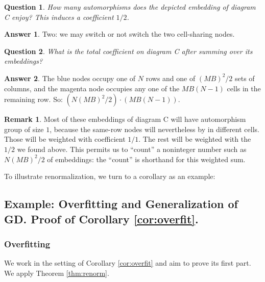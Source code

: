 \documentclass{article}
\theoremstyle{plain}
\newtheorem*{quest*}{Question}
\theoremstyle{definition}
\newtheorem*{answ*}{Answer}
\newtheorem*{rmk*}{Remark}
\begin{document}
            \begin{quest*}
                How many automorphisms does the depicted embedding of diagram C
                enjoy?
                This induces a coefficient $1/2$.
            \end{quest*}
            \begin{answ*}
                Two: we may switch or not switch the two cell-sharing nodes.
            \end{answ*}
            \begin{quest*}
                What is the total coefficient on diagram C after summing
                over its embeddings?
            \end{quest*}
            \begin{answ*}
                The blue nodes occupy one of $N$ rows and one of $(MB)^2/2$  
                sets of columns, and the magenta node occupies any one of the
                $MB(N-1)$ cells in the remaining row.  So:
                $(N(MB)^2/2) \cdot (MB(N-1))$.
            \end{answ*}
            \begin{rmk*}
                Most of these embeddings of diagram C will have automorphism
                group of size $1$, because the same-row nodes will nevertheless
                by in different cells.  Those will be weighted with coefficient
                $1/1$.  The rest will be weighted with the $1/2$ we found
                above.  This permits us to ``count'' a noninteger number such
                as $N(MB)^2/2$ of embeddings: the ``count'' is shorthand for
                this weighted sum.
            \end{rmk*}

            To illustrate renormalization, we turn to a corollary as an
            example:

    \subsection{
        Example: Overfitting and Generalization of GD.  Proof of Corollary
        \ref{cor:overfit}. 
    }
        \subsubsection*{Overfitting}
            We work in the setting of Corollary \ref{cor:overfit} and aim to
            prove its first part.  We apply Theorem \ref{thm:renorm}.  
\end{document}
